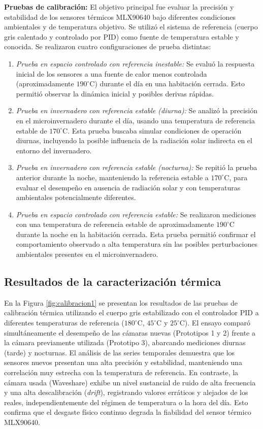 \textbf{Pruebas de calibración:} El objetivo principal fue evaluar la precisión y estabilidad de los sensores térmicos MLX90640 bajo diferentes condiciones ambientales y de temperatura objetivo. Se utilizó el sistema de referencia (cuerpo gris calentado y controlado por PID) como fuente de temperatura estable y conocida. Se realizaron cuatro configuraciones de prueba distintas:
\begin{enumerate}
    \item \textit{Prueba en espacio controlado con referencia inestable:} Se evaluó la respuesta inicial de los sensores a una fuente de calor menos controlada (aproximadamente $190^{\circ}$C) durante el día en una habitación cerrada. Esto permitió observar la dinámica inicial y posibles derivas rápidas.
    \item \textit{Prueba en invernadero con referencia estable (diurna):} Se analizó la precisión en el microinvernadero durante el día, usando una temperatura de referencia estable de $170^{\circ}$C. Esta prueba buscaba simular condiciones de operación diurnas, incluyendo la posible influencia de la radiación solar indirecta en el entorno del invernadero.
    \item \textit{Prueba en invernadero con referencia estable (nocturna):} Se repitió la prueba anterior durante la noche, manteniendo la referencia estable a $170^{\circ}$C, para evaluar el desempeño en ausencia de radiación solar y con temperaturas ambientales potencialmente diferentes.
    \item \textit{Prueba en espacio controlado con referencia estable:} Se realizaron mediciones con una temperatura de referencia estable de aproximadamente $190^{\circ}$C durante la noche en la habitación cerrada. Esta prueba permitió confirmar el comportamiento observado a alta temperatura sin las posibles perturbaciones ambientales presentes en el microinvernadero.
\end{enumerate}

\subsection{Resultados de la caracterización térmica}
\label{subsec:hardware_resultados_termico}

En la Figura \ref{fig:calibracion1} se presentan los resultados de las pruebas de calibración térmica utilizando el cuerpo gris estabilizado con el controlador PID a diferentes temperaturas de referencia ($180^{\circ}$C, $45^{\circ}$C y $25^{\circ}$C). El ensayo comparó simultáneamente el desempeño de las cámaras nuevas (Prototipos 1 y 2) frente a la cámara previamente utilizada (Prototipo 3), abarcando mediciones diurnas (tarde) y nocturnas. El análisis de las series temporales demuestra que los sensores nuevos presentan una alta precisión y estabilidad, manteniendo una correlación muy estrecha con la temperatura de referencia. En contraste, la cámara usada (Waveshare) exhibe un nivel sustancial de ruido de alta frecuencia y una alta descalibración (\textit{drift}), registrando valores erráticos y alejados de los reales, independientemente del régimen de temperatura o la hora del día. Esto confirma que el desgaste físico continuo degrada la fiabilidad del sensor térmico MLX90640.

